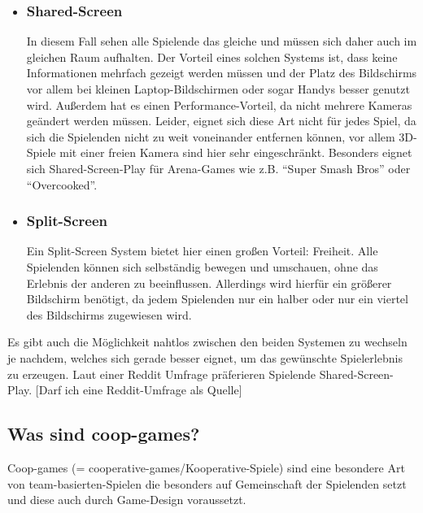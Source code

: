 \begin{itemize}
	
\item \subsubsection{Shared-Screen}

In diesem Fall sehen alle Spielende das gleiche und müssen sich daher auch im gleichen Raum aufhalten. Der Vorteil eines solchen Systems ist, dass keine Informationen mehrfach gezeigt werden müssen und der Platz des Bildschirms vor allem bei kleinen Laptop-Bildschirmen oder sogar Handys besser genutzt wird. Außerdem hat es einen Performance-Vorteil, da nicht mehrere Kameras geändert werden müssen. Leider, eignet sich diese Art nicht für jedes Spiel, da sich die Spielenden nicht zu weit voneinander entfernen können, vor allem 3D-Spiele mit einer freien Kamera sind hier sehr eingeschränkt. Besonders eignet sich Shared-Screen-Play für Arena-Games wie z.B. "`Super Smash Bros"' oder "`Overcooked"'.

\item \subsubsection{Split-Screen}

Ein Split-Screen System bietet hier einen großen Vorteil: Freiheit. Alle Spielenden können sich selbständig bewegen und umschauen, ohne das Erlebnis der anderen zu beeinflussen. Allerdings wird hierfür ein größerer Bildschirm benötigt, da jedem Spielenden nur ein halber oder nur ein viertel des Bildschirms zugewiesen wird.

\end{itemize}

\noindent Es gibt auch die Möglichkeit nahtlos zwischen den beiden Systemen zu wechseln je nachdem, welches sich gerade besser eignet, um das gewünschte Spielerlebnis zu erzeugen. Laut einer Reddit Umfrage präferieren Spielende Shared-Screen-Play. [Darf ich eine Reddit-Umfrage als Quelle]

\subsection{Was sind coop-games?}

Coop-games (= cooperative-games/Kooperative-Spiele) sind eine besondere Art von team-basierten-Spielen die besonders auf Gemeinschaft der Spielenden setzt und diese auch durch Game-Design voraussetzt. 

